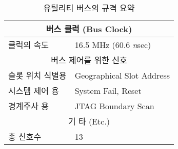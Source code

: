 %
%
\begin{table}[htbp]
\caption{유틸리티 버스의 규격 요약}\label{table:ub-spec}
   \begin{center}
   \begin{tabular}{|l l|} \hline
	\multicolumn{2}{|c|}{버스 클럭 (Bus Clock)} \\
\hline
	클럭의 속도 & 16.5 MHz (60.6 {\it n\/}sec) \\
\hline
	\multicolumn{2}{|c|}{버스 제어를 위한 신호} \\
\hline
	슬롯 위치 식별용 & Geographical Slot Address \\
	시스템 제어 용 & System Fail, Reset \\
	경계주사 용 & JTAG Boundary Scan \\
\hline
	\multicolumn{2}{|c|}{기 타 (Etc.)} \\
\hline
	총 신호수 & 13\\ \hline
   \end{tabular}
   \end{center}
\end{table}
%
%
